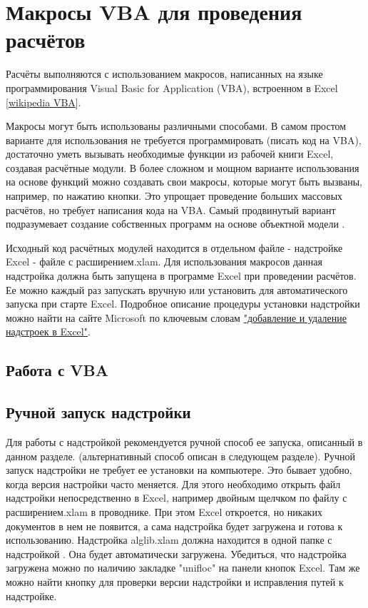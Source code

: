 \chapter{Макросы VBA для проведения расчётов}

Расчёты \unf{} выполняются с использованием макросов, написанных на языке программирования Visual Basic for Application (VBA), встроенном в Excel [\href{https://ru.wikipedia.org/wiki/Visual_Basic_for_Applications}{wikipedia VBA}]. 

Макросы \unf{} могут быть использованы различными способами. В самом простом варианте для использования \unf{} не требуется программировать (писать код на VBA), достаточно уметь вызывать необходимые функции из рабочей книги Excel, создавая расчётные модули. В более сложном и мощном варианте использования на основе функций \unf{} можно создавать свои макросы, которые могут быть вызваны, например, по нажатию кнопки. Это упрощает проведение больших массовых расчётов, но требует написания кода на VBA. Самый продвинутый вариант подразумевает создание собственных программ на основе объектной модели \unf{}. 


Исходный код расчётных модулей находится в отдельном файле - надстройке Excel - файле с расширением.xlam. Для использования макросов данная надстройка должна быть запущена в программе Excel при проведении расчётов. Ее можно каждый раз запускать вручную или установить для автоматического запуска при старте Excel. Подробное описание процедуры установки надстройки можно найти на сайте Microsoft по ключевым словам  \href{https://support.office.com/ru-ru/article/%D0%94%D0%BE%D0%B1%D0%B0%D0%B2%D0%BB%D0%B5%D0%BD%D0%B8%D0%B5-%D0%B8-%D1%83%D0%B4%D0%B0%D0%BB%D0%B5%D0%BD%D0%B8%D0%B5-%D0%BD%D0%B0%D0%B4%D1%81%D1%82%D1%80%D0%BE%D0%B5%D0%BA-%D0%B2-excel-0af570c4-5cf3-4fa9-9b88-403625a0b460}{"добавление и удаление надстроек в Excel"}.


\section{Работа с VBA}



\section{Ручной запуск надстройки}
Для работы с надстройкой рекомендуется ручной способ ее запуска, описанный в данном разделе. (альтернативный способ описан в следующем разделе).
Ручной запуск надстройки не требует ее установки на компьютере. Это бывает удобно, когда версия настройки часто меняется. Для этого необходимо открыть файл надстройки непосредственно в Excel, например двойным щелчком по файлу с расширением.xlam в проводнике. При этом Excel откроется, но никаких документов в нем не появится, а сама надстройка будет загружена и готова к использованию. Надстройка alglib.xlam должна находится в одной папке с надстройкой \unf. Она будет автоматически загружена.
Убедиться, что надстройка загружена можно по наличию закладке "unifloc" на панели кнопок Excel. Там же можно найти кнопку для проверки версии надстройки и исправления путей к надстройке. 

